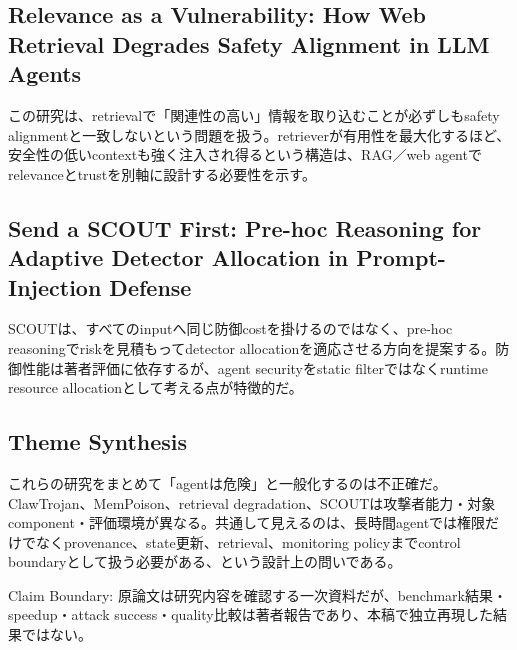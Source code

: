 \subsection{Relevance as a Vulnerability: How Web Retrieval Degrades Safety Alignment in LLM Agents}

この研究は、retrievalで「関連性の高い」情報を取り込むことが必ずしもsafety alignmentと一致しないという問題を扱う。retrieverが有用性を最大化するほど、安全性の低いcontextも強く注入され得るという構造は、RAG／web agentでrelevanceとtrustを別軸に設計する必要性を示す。\autocite{src-062c2718dd96}


\subsection{Send a SCOUT First: Pre-hoc Reasoning for Adaptive Detector Allocation in Prompt-Injection Defense}

SCOUTは、すべてのinputへ同じ防御costを掛けるのではなく、pre-hoc reasoningでriskを見積もってdetector allocationを適応させる方向を提案する。防御性能は著者評価に依存するが、agent securityをstatic filterではなくruntime resource allocationとして考える点が特徴的だ。\autocite{src-b818bca6d4b6}


\subsection{Theme Synthesis}

これらの研究をまとめて「agentは危険」と一般化するのは不正確だ。ClawTrojan、MemPoison、retrieval degradation、SCOUTは攻撃者能力・対象component・評価環境が異なる。共通して見えるのは、長時間agentでは権限だけでなくprovenance、state更新、retrieval、monitoring policyまでcontrol boundaryとして扱う必要がある、という設計上の問いである。\autocite{src-062c2718dd96,src-7fa0ea6bcf47,src-b818bca6d4b6,src-f216d6cd7707}


\begin{claimboundary}
Claim Boundary: 原論文は研究内容を確認する一次資料だが、benchmark結果・speedup・attack success・quality比較は著者報告であり、本稿で独立再現した結果ではない。\autocite{src-062c2718dd96,src-7fa0ea6bcf47,src-b818bca6d4b6,src-f216d6cd7707}
\end{claimboundary}

